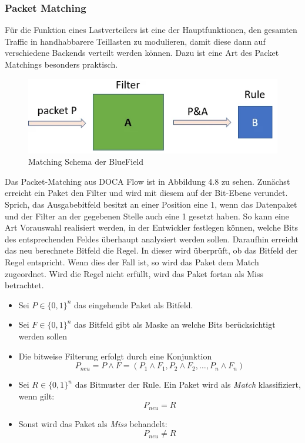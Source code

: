 \subsubsection{Packet Matching}
Für die Funktion eines Lastverteilers ist eine der Hauptfunktionen, den gesamten Traffic in handhabbarere Teillasten zu modulieren, damit diese dann auf verschiedene Backends verteilt werden können. Dazu ist eine Art des Packet Matchings besonders praktisch. 
\begin{figure}
    \centering
    \includegraphics[width=1\linewidth]{images/paketmatchng.png}
    \caption{Matching Schema der BlueField \cite{doca_matching}}
    \label{fig:enter-label}
\end{figure}
Das Packet-Matching aus DOCA Flow ist in Abbildung 4.8 zu sehen. Zunächst erreicht ein Paket den Filter und wird mit diesem auf der Bit-Ebene verundet. Sprich, das Ausgabebitfeld besitzt an einer Position eine 1, wenn das Datenpaket und der Filter an der gegebenen Stelle auch eine 1 gesetzt haben. So kann eine Art Vorauswahl realisiert werden, in der Entwickler festlegen können, welche Bits des entsprechenden Feldes überhaupt analysiert werden sollen. Daraufhin erreicht das neu berechnete Bitfeld die Regel. In dieser wird überprüft, ob das Bitfeld der Regel entspricht. Wenn dies der Fall ist, so wird das Paket dem Match zugeordnet. Wird die Regel nicht erfüllt, wird das Paket fortan als Miss betrachtet.
\begin{itemize}
  \item Sei $P \in \{0,1\}^n$ das eingehende Paket als Bitfeld.
  \item Sei $F \in \{0,1\}^n$ das Bitfeld gibt als Maske an welche Bits berücksichtigt werden sollen
  \item Die bitweise Filterung erfolgt durch eine Konjunktion  
  \[
    P_{neu} = P \land F = (P_1 \land F_1, P_2 \land F_2, \dots, P_n \land F_n)
  \]
  \item Sei $R \in \{0,1\}^n$ das Bitmuster der Rule. Ein Paket wird als \emph{Match} klassifiziert, wenn gilt:
  \[
    P_{neu} = R
  \]
  \item Sonst wird das Paket als \emph{Miss} behandelt:
  \[
    P_{neu} \ne R
  \]
\end{itemize}

